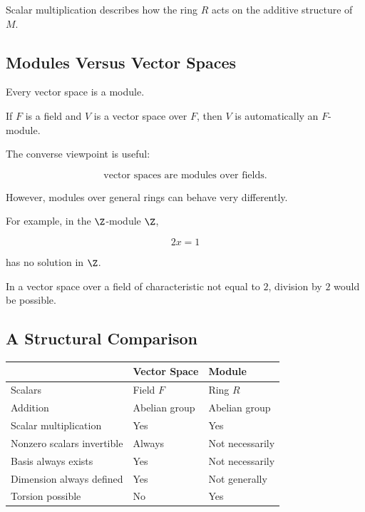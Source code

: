 Scalar multiplication describes how the ring \(R\) acts on the additive
structure of \(M\).

\subsection{Modules Versus Vector Spaces}
\label{subsec:modules-versus-vector-spaces}

Every vector space is a module.

If \(F\) is a field and \(V\) is a vector space over \(F\), then \(V\) is
automatically an \(F\)-module.

The converse viewpoint is useful:

\[
\boxed{\text{vector spaces are modules over fields}.}
\]

However, modules over general rings can behave very differently.

For example, in the \(\Z\)-module \(\Z\),

\[ 2x=1 \]

has no solution in \(\Z\).

In a vector space over a field of characteristic not equal to \(2\), division
by \(2\) would be possible.

\subsection{A Structural Comparison}
\label{subsec:module-vector-space-comparison}

\begin{center}
\begin{tabularx}{0.9\textwidth}{@{}lXX@{}}
\toprule
& \textbf{Vector Space} & \textbf{Module}\\
\midrule
Scalars & Field \(F\) & Ring \(R\)\\
Addition & Abelian group & Abelian group\\
Scalar multiplication & Yes & Yes\\
Nonzero scalars invertible & Always & Not necessarily\\
Basis always exists & Yes & Not necessarily\\
Dimension always defined & Yes & Not generally\\
Torsion possible & No & Yes\\
\bottomrule
\end{tabularx}
\end{center}

